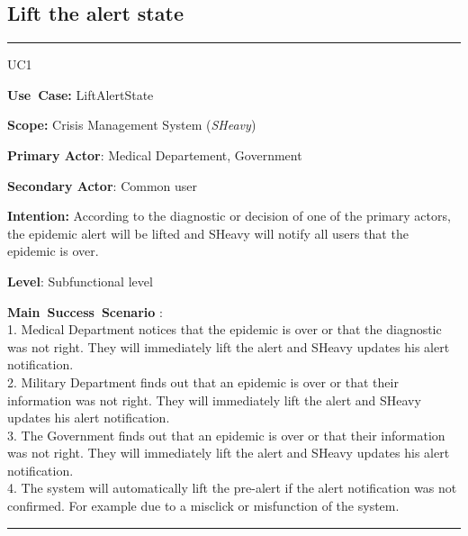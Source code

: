 \subsection{Lift the alert state}
\vspace{0.5cm}
\hrule
\vspace{0.5cm}
\begin{lyxlist}{UC1}
\small{
\item [\textbf{Use~Case:}] LiftAlertState
\item [\textbf{Scope:}] Crisis Management System (\emph{SHeavy})
\item [\textbf{Primary Actor}:] Medical Departement, Government
\item [\textbf{Secondary Actor}:] Common user
\item [\textbf{Intention:}] According to the diagnostic or decision of one of
the primary actors, the epidemic alert will be lifted and SHeavy will notify
all users that the epidemic is over.
\item [\textbf{Level}:]Subfunctional level
\item [\textbf{Main~Success~Scenario}]:\\
1. Medical Department notices that the epidemic is over or that the
diagnostic was not right. They will immediately lift the alert and SHeavy
updates his alert notification.\\
2. Military Department finds out that an epidemic is over or that their
information was not right. They will immediately lift the alert and SHeavy
updates his alert notification.\\
3. The Government finds out that an epidemic is over or that their
information was not right. They will immediately lift the alert and SHeavy
updates his alert notification.\\
4. The system will automatically lift the pre-alert if the alert notification
was not confirmed. For example due to a misclick or misfunction of the system.\\
}
\end{lyxlist}
\hrule
\vspace{0.5cm} 

